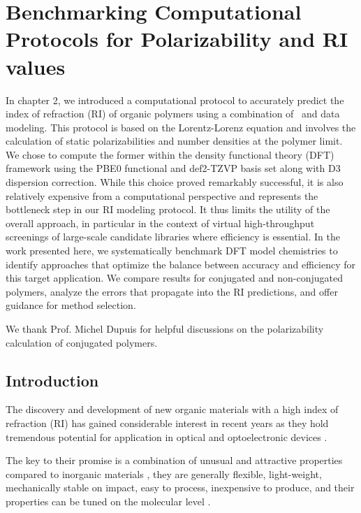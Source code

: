 \chapter{Benchmarking Computational Protocols for Polarizability and RI values}

In chapter 2, we introduced a computational protocol to accurately predict the index of refraction (RI) of organic polymers using a combination of \firstprinciples\ and data modeling. This protocol is based on the Lorentz-Lorenz equation and involves the calculation of static polarizabilities and number densities at the polymer limit. We chose to compute the former within the density functional theory (DFT) framework using the PBE0 functional and def2-TZVP basis set along with D3 dispersion correction. While this choice proved remarkably successful, it is also relatively expensive from a computational perspective and represents the bottleneck step in our RI modeling protocol. It thus limits the utility of the overall approach, in particular in the context of virtual high-throughput screenings of large-scale candidate libraries where efficiency is essential. In the work presented here, we systematically benchmark DFT model chemistries to identify approaches that optimize the balance between accuracy and efficiency for this target application. We compare results for conjugated and non-conjugated polymers, analyze the errors that propagate into the RI predictions, and offer guidance for method selection. 

We thank Prof. Michel Dupuis for helpful discussions on the polarizability calculation of conjugated polymers. 

\section{Introduction}
\label{sec:introduction}
The discovery and development of new organic materials with a high index of refraction (RI) has gained considerable interest in recent years as they hold tremendous potential for application in optical and optoelectronic devices \cite{Liou2010,Huang2016,Lei2014}.

The key to their promise is a combination of unusual and attractive properties compared to inorganic materials \cite{Higashihara2015}, \ie  they are generally flexible, light-weight, mechanically stable on impact, easy to process, inexpensive to produce, and their properties can be tuned on the molecular level \cite{Lu2005,Zimmermann1993,Liu2009}. 

